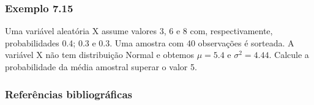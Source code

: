 \documentclass[11pt]{beamer}
\begin{document}
\begin{frame}
\frametitle{Exemplo 7.15}
Uma variável aleatória X assume valores 3, 6 e 8 com, respectivamente, probabilidades 0.4; 0.3 e 0.3. Uma amostra com 40 observações é sorteada. A variável X não tem distribuição Normal e obtemos \(\mu=5.4\) e \(\sigma^2=4.44\). Calcule a probabilidade da média amostral superar o valor 5.
\vspace{1in}
\vspace{1in}

\end{frame}

\begin{frame}
\frametitle{Referências bibliográficas}
\printbibliography
\end{frame}
\end{document}
